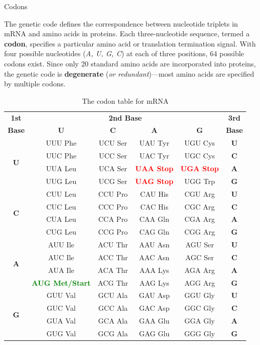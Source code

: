 \documentclass[10pt]{article}
\begin{document}
    \begin{core}{Codons}
      
      The genetic code defines the correspondence between nucleotide triplets in mRNA and amino acids in proteins. Each three-nucleotide sequence, termed a \textbf{codon}, specifies a particular amino acid or translation termination signal. With four possible nucleotides (\textit{A, U, G, C}) at each of three positions, 64 possible codons exist. Since only 20 standard amino acids are incorporated into proteins, the genetic code is \textbf{degenerate} (\textit{or redundant})---most amino acids are specified by multiple codons.

      \begin{table}[H]
        \centering
        \begin{tabular}{|c|cccc|c|}
          \hline
          \textbf{1st} & \multicolumn{4}{c|}{\textbf{2nd Base}} & \textbf{3rd} \\
          \textbf{Base} & \textbf{U} & \textbf{C} & \textbf{A} & \textbf{G} & \textbf{Base} \\
          \hline
          \multirow{4}{*}{\textbf{U}} & UUU Phe & UCU Ser & UAU Tyr & UGU Cys & \textbf{U} \\
          & UUC Phe & UCC Ser & UAC Tyr & UGC Cys & \textbf{C} \\
          & UUA Leu & UCA Ser & \textcolor{Red}{\textbf{UAA Stop}} & \textcolor{Red}{\textbf{UGA Stop}} & \textbf{A} \\
          & UUG Leu & UCG Ser & \textcolor{Red}{\textbf{UAG Stop}} & UGG Trp & \textbf{G} \\
          \hline
          \multirow{4}{*}{\textbf{C}} & CUU Leu & CCU Pro & CAU His & CGU Arg & \textbf{U} \\
          & CUC Leu & CCC Pro & CAC His & CGC Arg & \textbf{C} \\
          & CUA Leu & CCA Pro & CAA Gln & CGA Arg & \textbf{A} \\
          & CUG Leu & CCG Pro & CAG Gln & CGG Arg & \textbf{G} \\
          \hline
          \multirow{4}{*}{\textbf{A}} & AUU Ile & ACU Thr & AAU Asn & AGU Ser & \textbf{U} \\
          & AUC Ile & ACC Thr & AAC Asn & AGC Ser & \textbf{C} \\
          & AUA Ile & ACA Thr & AAA Lys & AGA Arg & \textbf{A} \\
          & \textcolor{Green}{\textbf{AUG Met/Start}} & ACG Thr & AAG Lys & AGG Arg & \textbf{G} \\
          \hline
          \multirow{4}{*}{\textbf{G}} & GUU Val & GCU Ala & GAU Asp & GGU Gly & \textbf{U} \\
          & GUC Val & GCC Ala & GAC Asp & GGC Gly & \textbf{C} \\
          & GUA Val & GCA Ala & GAA Glu & GGA Gly & \textbf{A} \\
          & GUG Val & GCG Ala & GAG Glu & GGG Gly & \textbf{G} \\
          \hline
        \end{tabular}
        \caption{The codon table for mRNA}
        \label{tab:genetic_code}
      \end{table}
      

\end{core}
\end{document}
